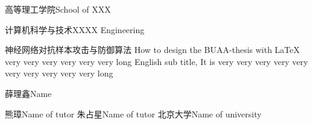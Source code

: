 
\school
{高等理工学院}{School of XXX}

\major
{计算机科学与技术}{XXXX Engineering}

\thesistitle
{神经网络对抗样本攻击与防御算法}
{}
{How to design the BUAA-thesis with \LaTeX{} very very very very very very long}
{English sub title, It is very very very very very very very very very very long}

\thesisauthor
{薛理鑫}{Name}

\teacher
{熊璋}{Name of tutor}
\newteacher
{朱占星}{Name of tutor}
\newuni
{北京大学}{Name of university}






